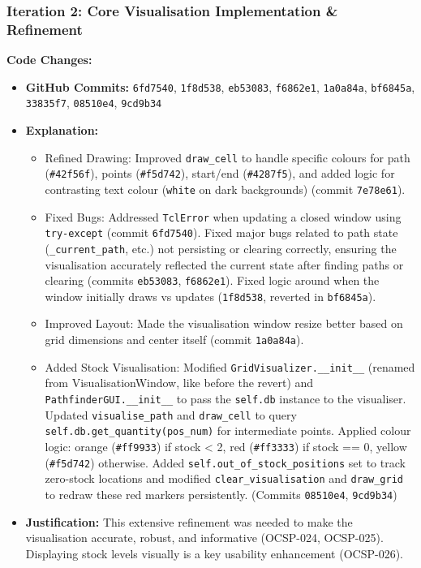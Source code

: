 \newpage

\subsubsection{Iteration 2: Core Visualisation Implementation \& Refinement}

\textbf{Code Changes:}
\begin{itemize}
	\item \textbf{GitHub Commits:} \verb|6fd7540|, \verb|1f8d538|, \verb|eb53083|, \verb|f6862e1|, \verb|1a0a84a|, \verb|bf6845a|, \verb|33835f7|, \verb|08510e4|, \verb|9cd9b34|
	\item \textbf{Explanation:}
	\begin{itemize}
		\item Refined Drawing: Improved \verb|draw_cell| to handle specific colours for path (\verb|#42f56f|), points (\verb|#f5d742|), start/end (\verb|#4287f5|), and added logic for contrasting text colour (\verb|white| on dark backgrounds) (commit \verb|7e78e61|).
		\item Fixed Bugs: Addressed \verb|TclError| when updating a closed window using \verb|try-except| (commit \verb|6fd7540|). Fixed major bugs related to path state (\verb|_current_path|, etc.) not persisting or clearing correctly, ensuring the visualisation accurately reflected the current state after finding paths or clearing (commits \verb|eb53083|, \verb|f6862e1|). Fixed logic around when the window initially draws vs updates (\verb|1f8d538|, reverted in \verb|bf6845a|).
		\item Improved Layout: Made the visualisation window resize better based on grid dimensions and center itself (commit \verb|1a0a84a|).
		\item Added Stock Visualisation: Modified \verb|GridVisualizer.__init__| (renamed from VisualisationWindow, like before the revert) and \verb|PathfinderGUI.__init__| to pass the \verb|self.db| instance to the visualiser. Updated \verb|visualise_path| and \verb|draw_cell| to query \verb|self.db.get_quantity(pos_num)| for intermediate points. Applied colour logic: orange (\verb|#ff9933|) if stock < 2, red (\verb|#ff3333|) if stock == 0, yellow (\verb|#f5d742|) otherwise. Added \verb|self.out_of_stock_positions| set to track zero-stock locations and modified \verb|clear_visualisation| and \verb|draw_grid| to redraw these red markers persistently. (Commits \verb|08510e4|, \verb|9cd9b34|)
	\end{itemize}
	\item \textbf{Justification:} This extensive refinement was needed to make the visualisation accurate, robust, and informative (OCSP-024, OCSP-025). Displaying stock levels visually is a key usability enhancement (OCSP-026).
\end{itemize}

